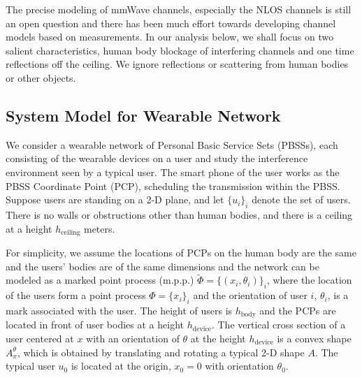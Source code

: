 \documentclass[10pt, conference, letterpaper]{IEEEtran}
\begin{document}
The precise modeling of mmWave channels, especially the NLOS channels is still an open question and there has been much effort towards developing channel models based on measurements. 
In our analysis below, we shall focus on two salient characteristics, human body blockage of interfering channels and one time reflections off the ceiling. 
We ignore reflections or scattering from human bodies or other objects.

\subsection{System Model for Wearable Network}\label{section:channel:model}
We consider a wearable network of Personal Basic Service Sets (PBSSs), each consisting of the wearable devices on a user and study the interference environment seen by a typical user. 
The smart phone of the user works as the PBSS Coordinate Point (PCP), scheduling the transmission within the PBSS. 
Suppose users are standing on a 2-D plane, and let $\{u_i\}_i$ denote the set of users.
There is no walls or obstructions other than human bodies, and there is a ceiling at a height $h_{\mathrm{ceiling}}$ meters. 

For simplicity, we assume the locations of PCPs on the human body are the same and the users' bodies are of the same dimensions and the network can be modeled as a marked point process (m.p.p.) $\tilde{\Phi}=\{(x_i, \theta_i)\}_i$, where the location of the users form a point process $\Phi=\{x_i\}_i$ and the orientation of user $i$, $\theta_i$, is a mark associated with the user. 
The height of users is $h_{\mathrm{body}}$ and the PCPs are located in front of user bodies at a height $h_{\mathrm{device}}$. 
The vertical cross section of a user centered at $x$ with an orientation of $\theta$ at the height $h_{\mathrm{device}}$ is a convex shape $A_x^{\theta}$, which is obtained by translating and rotating a typical 2-D shape $A$. 
The typical user $u_0$ is located at the origin, $x_0=0$ with orientation $\theta_0$.
\end{document}
